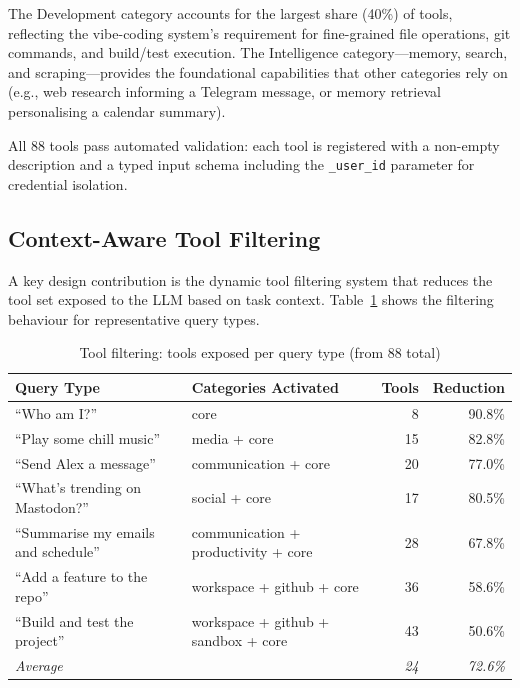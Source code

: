 The Development category accounts for the largest share (40\%) of tools, reflecting the vibe-coding system's requirement for fine-grained file operations, git commands, and build/test execution. The Intelligence category---memory, search, and scraping---provides the foundational capabilities that other categories rely on (e.g., web research informing a Telegram message, or memory retrieval personalising a calendar summary).

All 88 tools pass automated validation: each tool is registered with a non-empty description and a typed input schema including the \texttt{\_user\_id} parameter for credential isolation.

\subsection{Context-Aware Tool Filtering}

A key design contribution is the dynamic tool filtering system that reduces the tool set exposed to the LLM based on task context. Table~\ref{tab:filtering} shows the filtering behaviour for representative query types.

\begin{table}[H]
\centering
\caption{Tool filtering: tools exposed per query type (from 88 total)}
\label{tab:filtering}
\small
\begin{tabular}{l l r r}
\toprule
\textbf{Query Type} & \textbf{Categories Activated} & \textbf{Tools} & \textbf{Reduction} \\
\midrule
``Who am I?''                    & core                              &  8 & 90.8\% \\
``Play some chill music''        & media + core                      & 15 & 82.8\% \\
``Send Alex a message''          & communication + core              & 20 & 77.0\% \\
``What's trending on Mastodon?'' & social + core                     & 17 & 80.5\% \\
``Summarise my emails and schedule'' & communication + productivity + core & 28 & 67.8\% \\
``Add a feature to the repo''    & workspace + github + core         & 36 & 58.6\% \\
``Build and test the project''   & workspace + github + sandbox + core & 43 & 50.6\% \\
\midrule
\textit{Average}                 &                                   & \textit{24} & \textit{72.6\%} \\
\bottomrule
\end{tabular}
\end{table}

